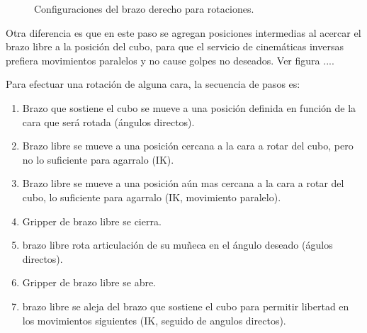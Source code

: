 \begin{figure}[h!]
	\centering
	\hfill
	\hfill
	\caption{Configuraciones del brazo derecho para rotaciones.}
	\label{mover}
\end{figure}
Otra diferencia es que en este paso se agregan posiciones intermedias al acercar el brazo libre a la posición del cubo, para que el servicio de cinemáticas inversas prefiera movimientos paralelos y no cause golpes no deseados. Ver figura ....

Para efectuar una rotación de alguna cara, la secuencia de pasos es:
\begin{enumerate}
	\item Brazo que sostiene el cubo se mueve a una posición definida en función de la cara que será rotada (ángulos directos).
	\item Brazo libre se mueve a una posición cercana a la cara a rotar del cubo, pero no lo suficiente para agarralo (IK).
	\item Brazo libre se mueve a una posición aún mas cercana a la cara a rotar del cubo, lo suficiente para agarralo (IK, movimiento paralelo).
	\item Gripper de brazo libre se cierra.
	\item brazo libre rota articulación de su muñeca en el ángulo deseado (águlos directos).
	\item Gripper de brazo libre se abre.
	\item brazo libre se aleja del brazo que sostiene el cubo para permitir libertad en los movimientos siguientes (IK, seguido de angulos directos).
\end{enumerate}

